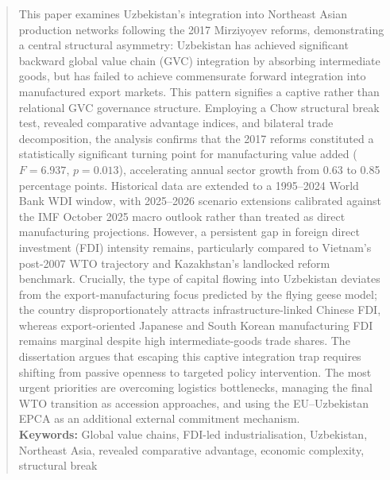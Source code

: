 \documentclass[14pt,a4paper]{extarticle}
\begin{document}
\thispagestyle{empty}



\begin{abstract}
\noindent This paper examines Uzbekistan's integration into Northeast Asian production networks following the 2017 Mirziyoyev reforms, demonstrating a central structural asymmetry: Uzbekistan has achieved significant backward global value chain (GVC) integration by absorbing intermediate goods, but has failed to achieve commensurate forward integration into manufactured export markets. This pattern signifies a captive rather than relational GVC governance structure. Employing a Chow structural break test, revealed comparative advantage indices, and bilateral trade decomposition, the analysis confirms that the 2017 reforms constituted a statistically significant turning point for manufacturing value added ($F=6.937$, $p=0.013$), accelerating annual sector growth from 0.63 to 0.85 percentage points. Historical data are extended to a 1995--2024 World Bank WDI window, with 2025--2026 scenario extensions calibrated against the IMF October 2025 macro outlook rather than treated as direct manufacturing projections. However, a persistent gap in foreign direct investment (FDI) intensity remains, particularly compared to Vietnam's post-2007 WTO trajectory and Kazakhstan's landlocked reform benchmark. Crucially, the type of capital flowing into Uzbekistan deviates from the export-manufacturing focus predicted by the flying geese model; the country disproportionately attracts infrastructure-linked Chinese FDI, whereas export-oriented Japanese and South Korean manufacturing FDI remains marginal despite high intermediate-goods trade shares. The dissertation argues that escaping this captive integration trap requires shifting from passive openness to targeted policy intervention. The most urgent priorities are overcoming logistics bottlenecks, managing the final WTO transition as accession approaches, and using the EU--Uzbekistan EPCA as an additional external commitment mechanism. \\[0.5em]
\noindent\textbf{Keywords:} Global value chains, FDI-led industrialisation, Uzbekistan, Northeast Asia, revealed comparative advantage, economic complexity, structural break
\end{abstract}

\newpage
\tableofcontents
\newpage

\end{document}
